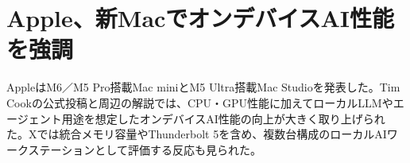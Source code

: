 \section{Apple、新MacでオンデバイスAI性能を強調}
AppleはM6／M5 Pro搭載Mac miniとM5 Ultra搭載Mac Studioを発表した。Tim Cookの公式投稿と周辺の解説では、CPU・GPU性能に加えてローカルLLMやエージェント用途を想定したオンデバイスAI性能の向上が大きく取り上げられた。Xでは統合メモリ容量やThunderbolt 5を含め、複数台構成のローカルAIワークステーションとして評価する反応も見られた。
